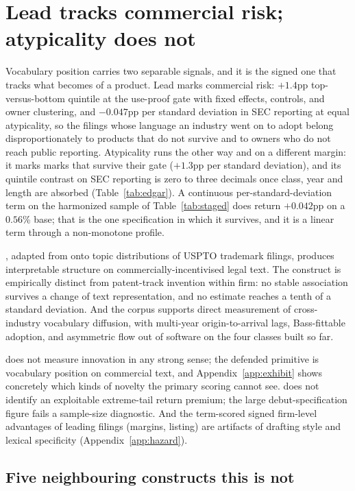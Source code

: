 \section{Lead tracks commercial risk; atypicality does not}\label{sec:limits}

Vocabulary position carries two separable signals, and it is the signed one that tracks
what becomes of a product. Lead marks commercial risk: $+1.4$pp
top-versus-bottom quintile at the use-proof gate with fixed effects,
controls, and owner clustering, and $-0.047$pp per standard deviation in SEC reporting
at equal atypicality, so the filings whose language an industry went on to
adopt belong disproportionately to products that do not survive and to
owners who do not reach public reporting. Atypicality runs the other way and on a different margin: it marks marks that
survive their gate ($+1.3$pp per standard deviation), and its quintile
contrast on SEC reporting is zero to three decimals once class, year and
length are absorbed (Table~\ref{tab:edgar}). A continuous per-standard-deviation
term on the harmonized sample of Table~\ref{tab:staged} does return $+0.042$pp
on a $0.56$\% base; that is the one specification in which it survives, and it
is a linear term through a non-monotone profile.

\dkl{}, adapted from
\citet{Murdock2017, Barron2018} onto topic distributions of USPTO
trademark filings, produces interpretable structure on
commercially-incentivised legal text. The construct is
empirically distinct from patent-track invention within firm: no stable
association survives a change of text representation, and no estimate reaches
a tenth of a standard deviation. And the
corpus supports direct measurement of cross-industry vocabulary
diffusion, with multi-year origin-to-arrival lags, Bass-fittable
adoption, and asymmetric flow out of software on the four classes built so
far.

\dkl{} does not measure innovation in any
strong sense; the defended primitive is vocabulary position on
commercial text, and Appendix~\ref{app:exhibit} shows concretely which
kinds of novelty the primary scoring cannot see. \dkl{} does not
identify an exploitable extreme-tail return premium; the large
debut-specification figure fails a sample-size diagnostic. And the
term-scored signed firm-level advantages of leading filings
(margins, listing) are artifacts of drafting style and lexical
specificity (Appendix~\ref{app:hazard}).

\subsection{Five neighbouring constructs this is not}

